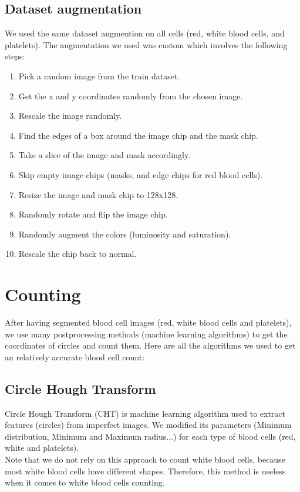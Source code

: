 \subsection{Dataset augmentation}
We used the same dataset augmention on all cells (red, white blood cells, and platelets).
The augmentation we used was custom which involves the following steps:
\begin{enumerate}
    \item Pick a random image from the train dataset.
    \item Get the x and y coordinates randomly from the chosen image.
    \item Rescale the image randomly.
    \item Find the edges of a box around the image chip and the mask chip.
    \item Take a slice of the image and mask accordingly.
    \item Skip empty image chips (masks, and edge chips for red blood cells).
    \item Resize the image and mask chip to 128x128.
    \item Randomly rotate and flip the image chip.
    \item Randomly augment the colors (luminosity and saturation).
    \item Rescale the chip back to normal.
\end{enumerate}

\section{Counting}
\vspace{0.2in}
\hspace*{0.16in}
After having segmented blood cell images (red, white blood cells and platelets), we use many postprocessing methods (machine learning algorithms) to get the coordinates of circles and count them.
Here are all the algorithms we used to get an relatively accurate blood cell count:

\subsection{Circle Hough Transform}
Circle Hough Transform (CHT) is machine learning algorithm used to extract features (circles) from imperfect images.
We modified its parameters (Minimum distribution, Minimum and Maximum radius...) for each type of blood cells (red, white and platelets).\\
Note that we do not rely on this approach to count white blood cells, because most white blood cells have different shapes.
Therefore, this method is useless when it comes to white blood cells counting.

